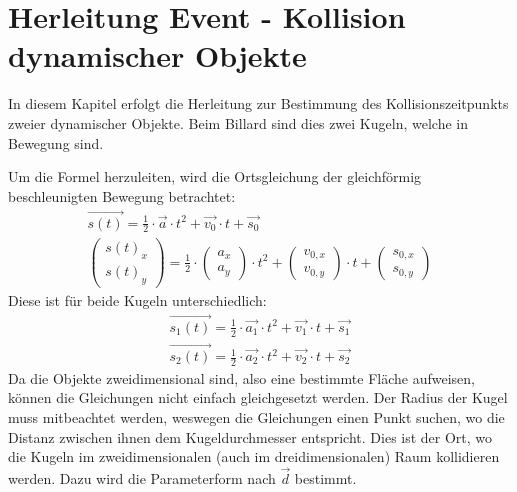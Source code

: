 \section{Herleitung Event - Kollision dynamischer Objekte}\label{anhang:herleitung:event:dynamicObjectCollision}
In diesem Kapitel erfolgt die Herleitung zur Bestimmung des Kollisionszeitpunkts zweier dynamischer Objekte. Beim Billard
sind dies zwei Kugeln, welche in Bewegung sind.

Um die Formel herzuleiten, wird die Ortsgleichung der gleichförmig beschleunigten Bewegung betrachtet:
\begin{align}
    \vec{s(t)} = \frac{1}{2} \cdot \vec{a} \cdot t^2 + \vec{v_0} \cdot t + \vec{s_0}\\
    \begin{pmatrix}s(t)_x\\s(t)_y\end{pmatrix} = \frac{1}{2} \cdot \begin{pmatrix}a_x\\a_y\end{pmatrix} \cdot t^2 + \begin{pmatrix}v_{0, x}\\v_{0, y}\end{pmatrix} \cdot t + \begin{pmatrix}s_{0, x}\\s_{0, y}\end{pmatrix}
\end{align}
Diese ist für beide Kugeln unterschiedlich:
\begin{align}
    \vec{s_1(t)} = \frac{1}{2} \cdot \vec{a_1} \cdot t^2 + \vec{v_{1}} \cdot t + \vec{s_{1}}\\
    \vec{s_2(t)} = \frac{1}{2} \cdot \vec{a_2} \cdot t^2 + \vec{v_{2}} \cdot t + \vec{s_{2}}
\end{align}
Da die Objekte zweidimensional sind, also eine bestimmte Fläche aufweisen, können die Gleichungen nicht einfach gleichgesetzt
werden. Der Radius der Kugel muss mitbeachtet werden, weswegen die Gleichungen einen Punkt suchen, wo die
Distanz zwischen ihnen dem Kugeldurchmesser entspricht. Dies ist der Ort, wo die Kugeln im zweidimensionalen
(auch im dreidimensionalen) Raum kollidieren werden. Dazu wird die Parameterform nach $\vec{d}$ bestimmt.
